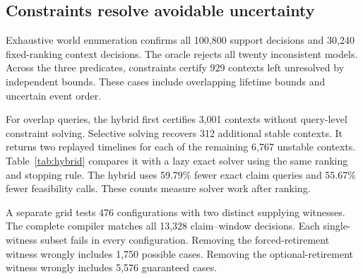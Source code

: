 \subsection{Constraints resolve avoidable uncertainty}
Exhaustive world enumeration confirms all 100,800 support decisions and 30,240 fixed-ranking context decisions.
The oracle rejects all twenty inconsistent models.
Across the three predicates, constraints certify 929 contexts left unresolved by independent bounds.
These cases include overlapping lifetime bounds and uncertain event order.

For overlap queries, the hybrid first certifies 3,001 contexts without query-level constraint solving.
Selective solving recovers 312 additional stable contexts.
It returns two replayed timelines for each of the remaining 6,767 unstable contexts.
Table~\ref{tab:hybrid} compares it with a lazy exact solver using the same ranking and stopping rule.
The hybrid uses 59.79\% fewer exact claim queries and 55.67\% fewer feasibility calls.
These counts measure solver work after ranking.


A separate grid tests 476 configurations with two distinct supplying witnesses.
The complete compiler matches all 13,328 claim--window decisions.
Each single-witness subset fails in every configuration.
Removing the forced-retirement witness wrongly includes 1,750 possible cases.
Removing the optional-retirement witness wrongly includes 5,576 guaranteed cases.
